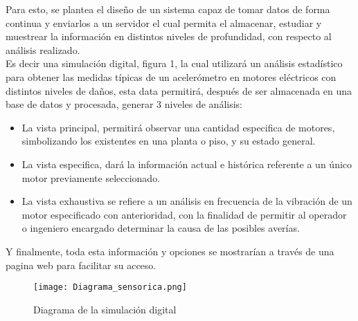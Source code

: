 

Para esto, se plantea el diseño de un sistema capaz de tomar datos de forma continua y enviarlos a un servidor el cual permita el almacenar, estudiar y muestrear la información en distintos niveles de profundidad, con respecto al análisis realizado.\\
Es decir una simulación digital, figura 1, la cual utilizará un análisis estadístico para obtener las medidas típicas de un acelerómetro en motores eléctricos con distintos niveles de daños, esta data permitirá, después de ser almacenada en una base de datos y procesada, generar 3 niveles de análisis:\\
\begin{itemize}
\item La vista principal, permitirá observar una cantidad especifica de motores, simbolizando los existentes en una planta o piso, y su estado general.

\item La vista especifica, dará la información actual e histórica referente a un único motor previamente seleccionado.

\item La vista exhaustiva se refiere a un análisis en frecuencia de la vibración de un motor especificado con anterioridad, con la finalidad de permitir al operador o ingeniero encargado determinar la causa de las posibles averías. 
\end{itemize}


Y finalmente, toda esta información y opciones se mostrarían a través de una pagina web para facilitar su acceso.

\begin{figure}[htb]
\centering
\label{fig:diagrama}
\caption{Diagrama de la simulación digital}
\texttt{[image: Diagrama\_sensorica.png]}
\end{figure}


